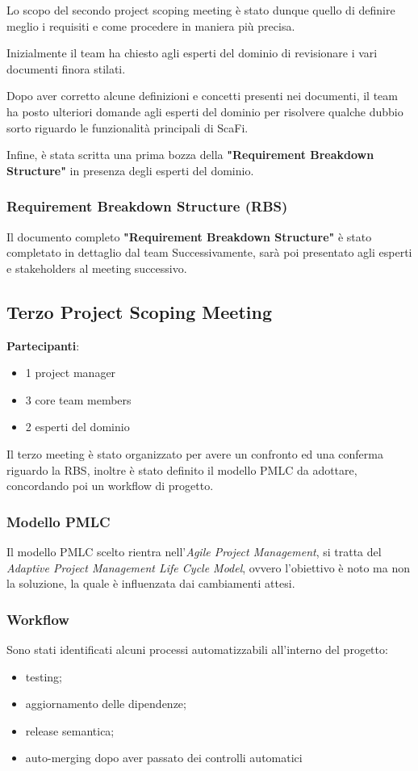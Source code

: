 Lo scopo del secondo project scoping meeting è stato dunque quello di definire meglio i requisiti e come procedere in maniera più precisa.

Inizialmente il team ha chiesto agli esperti del dominio di revisionare i vari documenti finora stilati.

Dopo aver corretto alcune definizioni e concetti presenti nei documenti, il team ha posto ulteriori domande agli esperti del dominio per risolvere
qualche dubbio sorto riguardo le funzionalità principali di ScaFi.

Infine, è stata scritta una prima bozza della \textbf{"Requirement Breakdown Structure"} in presenza degli esperti del dominio.

\subsubsection{Requirement Breakdown Structure (RBS)}
Il documento completo \textbf{"Requirement Breakdown Structure"} è stato completato in dettaglio dal team Successivamente, sarà poi presentato agli esperti e stakeholders al meeting successivo.

\subsection{Terzo Project Scoping Meeting}
\textbf{Partecipanti}:
\begin{itemize}
    \item 1 project manager
    \item 3 core team members
    \item 2 esperti del dominio
\end{itemize}

Il terzo meeting è stato organizzato per avere un confronto ed una conferma riguardo la RBS, inoltre è stato definito il modello PMLC
da adottare, concordando poi un workflow di progetto.

\subsubsection{Modello PMLC}
Il modello PMLC scelto rientra nell'\textit{Agile Project Management}, si tratta del \textit{Adaptive Project Management
    Life Cycle Model}, ovvero l'obiettivo è noto ma non la soluzione, la quale è influenzata dai cambiamenti attesi.


\subsubsection{Workflow}
Sono stati identificati alcuni processi automatizzabili all'interno del progetto:
\begin{itemize}
    \item testing;
    \item aggiornamento delle dipendenze;
    \item release semantica;
    \item auto-merging dopo aver passato dei controlli automatici
\end{itemize}

